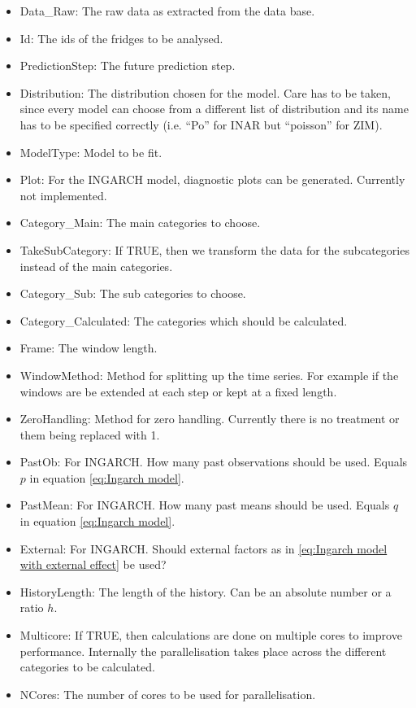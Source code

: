 \begin{itemize}
	\item Data\_Raw: The raw data as extracted from the data base.
  \item Id: The ids of the fridges to be analysed.
  \item PredictionStep: The future prediction step.
  \item Distribution: The distribution chosen for the model. Care has to be taken, since every model can choose from a different list of distribution and its name has to be specified correctly (i.e. "`Po"' for INAR but "`poisson"' for ZIM).
  \item ModelType: Model to be fit. 
  \item Plot: For the INGARCH model, diagnostic plots can be generated. Currently not implemented.
  \item Category\_Main: The main categories to choose. 
  \item TakeSubCategory: If TRUE, then we transform the data for the subcategories instead of the main categories. 
  \item Category\_Sub: The sub categories to choose.
  \item Category\_Calculated: The categories which should be calculated. 
  \item Frame: The window length.
  \item WindowMethod: Method for splitting up the time series. For example if the windows are be extended at each step or kept at a fixed length.
  \item ZeroHandling: Method for zero handling. Currently there is no treatment or them being replaced with 1. 
  \item PastOb: For INGARCH. How many past observations should be used. Equals $p$ in equation \ref{eq:Ingarch model}.
  \item PastMean: For INGARCH. How many past means should be used. Equals $q$ in equation \ref{eq:Ingarch model}.
  \item External: For INGARCH. Should external factors as in \ref{eq:Ingarch model with external effect} be used?
  \item HistoryLength: The length of the history. Can be an absolute number or a ratio $h$.
  \item Multicore: If TRUE, then calculations are done on multiple cores to improve performance. Internally the parallelisation takes place across the different categories to be calculated. 
  \item NCores: The number of cores to be used for parallelisation. 
\end{itemize}

